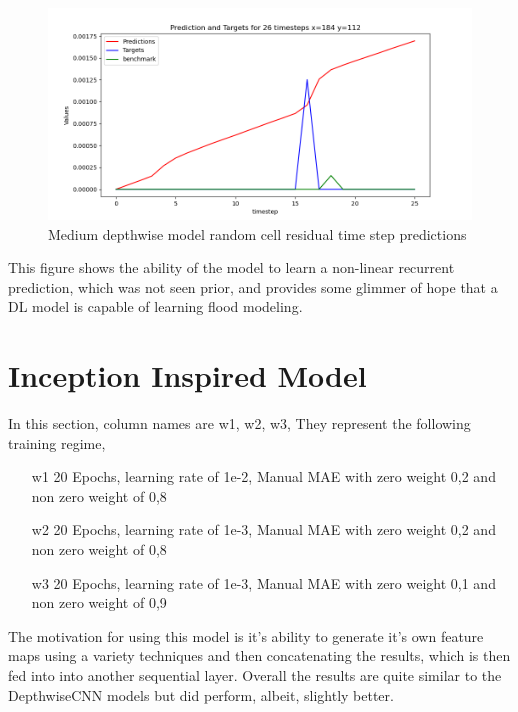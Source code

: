 \begin{figure}[tbph]
	\centering
	\includegraphics[width=0.8\linewidth, height=0.3\textheight]{"Figures/Results/feature_manip/medium_depthwise_diff_train_4_custom_mae_weighted_7_20 epochs_norm_independant_normal_292_random_cell_residual"}
	\caption[Medium depthwise model random cell residual time step predictions]{Medium depthwise model random cell residual time step predictions}
	\label{fig:random-success}
\end{figure}

This figure shows the ability of the model to learn a non-linear recurrent  prediction, which was not seen prior, and provides some glimmer of hope that a DL model is capable of learning flood modeling.


\section{Inception Inspired Model}
In this section, column names are w1, w2, w3, They represent the following training regime,
\begin{enumerate}
	\item[w1] 20 Epochs, learning rate of 1e-2, Manual MAE with zero weight 0,2 and non zero weight of 0,8
	\item[w2] 20 Epochs, learning rate of 1e-3, Manual MAE with zero weight 0,2 and non zero weight of 0,8
	\item[w3] 20 Epochs, learning rate of 1e-3, Manual MAE with zero weight 0,1 and non zero weight of 0,9
\end{enumerate}

The motivation for using this model is it's ability to generate it's own feature maps using a variety techniques and then concatenating the results, which is then fed into into another sequential layer. Overall the results are quite similar to the DepthwiseCNN models but did perform, albeit, slightly better.

